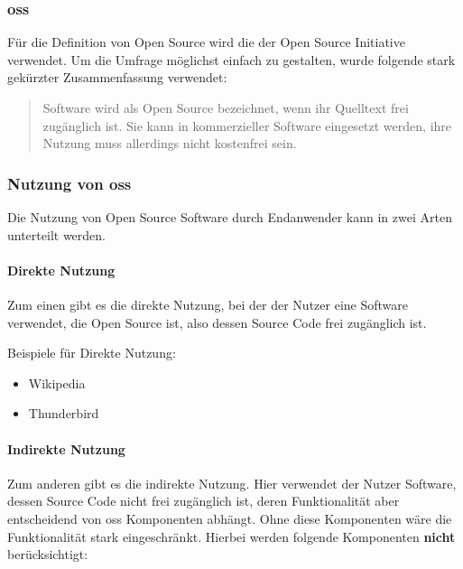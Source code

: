 \documentclass[a4paper]{article}
\begin{document}
            \subsubsection{\acrlong{oss}}
                Für die Definition von Open Source wird die der Open Source Initiative verwendet\cite{oss:definition}. Um die Umfrage möglichst einfach zu gestalten, wurde folgende stark gekürzter Zusammenfassung verwendet:
                \begin{quote} 
                    \centering 
                    Software wird als Open Source bezeichnet, wenn ihr Quelltext frei zugänglich ist. Sie kann in kommerzieller Software eingesetzt werden, ihre Nutzung muss allerdings nicht kostenfrei sein. 
                \end{quote}
                
            \subsubsection{Nutzung von \acrlong{oss}}\label{section:indirekte_nutzung}
                Die Nutzung von Open Source Software durch Endanwender kann in zwei Arten unterteilt werden.
                
                \paragraph{Direkte Nutzung}
                    Zum einen gibt es die direkte Nutzung, bei der der Nutzer eine Software verwendet, die Open Source ist, also dessen Source Code frei zugänglich ist.
                    
                    Beispiele für Direkte Nutzung:
                    \begin{itemize}
                        \item Wikipedia
                        \item Thunderbird
                    \end{itemize}
                    
                \paragraph{Indirekte Nutzung}
                    Zum anderen gibt es die indirekte Nutzung. Hier verwendet der Nutzer Software, dessen Source Code nicht frei zugänglich ist, deren Funktionalität aber entscheidend von \gls{oss} Komponenten abhängt. Ohne diese Komponenten wäre die Funktionalität stark eingeschränkt. Hierbei werden folgende Komponenten \textbf{nicht} berücksichtigt:
                    
\end{document}
